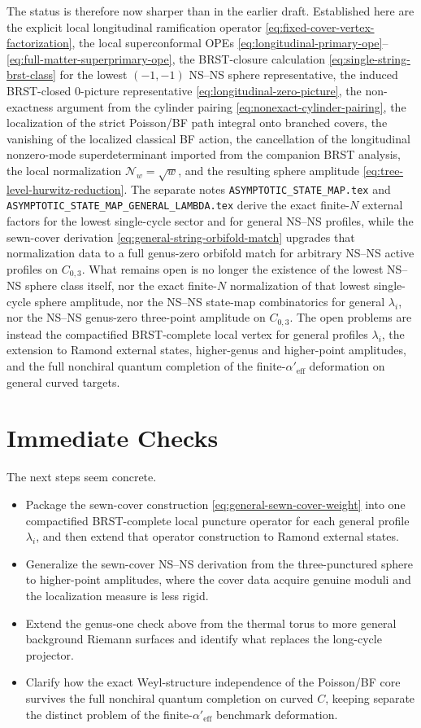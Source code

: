 \documentclass[11pt]{article}
\newcommand{\Aeff}{\alpha'_{\mathrm{eff}}}
\newcommand{\mc}[1]{\mathcal{#1}}
\begin{document}
The status is therefore now sharper than in the earlier draft. Established here are the explicit local longitudinal ramification operator \eqref{eq:fixed-cover-vertex-factorization}, the local superconformal OPEs \eqref{eq:longitudinal-primary-ope}--\eqref{eq:full-matter-superprimary-ope}, the BRST-closure calculation \eqref{eq:single-string-brst-class} for the lowest $(-1,-1)$ NS--NS sphere representative, the induced BRST-closed $0$-picture representative \eqref{eq:longitudinal-zero-picture}, the non-exactness argument from the cylinder pairing \eqref{eq:nonexact-cylinder-pairing}, the localization of the strict Poisson/BF path integral onto branched covers, the vanishing of the localized classical BF action, the cancellation of the longitudinal nonzero-mode superdeterminant imported from the companion BRST analysis, the local normalization $\mc N_w=\sqrt w$, and the resulting sphere amplitude \eqref{eq:tree-level-hurwitz-reduction}. The separate notes \texttt{ASYMPTOTIC\_STATE\_MAP.tex} and \texttt{ASYMPTOTIC\_STATE\_MAP\_GENERAL\_LAMBDA.tex} derive the exact finite-$N$ external factors for the lowest single-cycle sector and for general NS--NS profiles, while the sewn-cover derivation \eqref{eq:general-string-orbifold-match} upgrades that normalization data to a full genus-zero orbifold match for arbitrary NS--NS active profiles on $C_{0,3}$. What remains open is no longer the existence of the lowest NS--NS sphere class itself, nor the exact finite-$N$ normalization of that lowest single-cycle sphere amplitude, nor the NS--NS state-map combinatorics for general $\lambda_i$, nor the NS--NS genus-zero three-point amplitude on $C_{0,3}$. The open problems are instead the compactified BRST-complete local vertex for general profiles $\lambda_i$, the extension to Ramond external states, higher-genus and higher-point amplitudes, and the full nonchiral quantum completion of the finite-$\Aeff$ deformation on general curved targets.

\section{Immediate Checks}
The next steps seem concrete.
\begin{itemize}
\item Package the sewn-cover construction \eqref{eq:general-sewn-cover-weight} into one compactified BRST-complete local puncture operator for each general profile $\lambda_i$, and then extend that operator construction to Ramond external states.
\item Generalize the sewn-cover NS--NS derivation from the three-punctured sphere to higher-point amplitudes, where the cover data acquire genuine moduli and the localization measure is less rigid.
\item Extend the genus-one check above from the thermal torus to more general background Riemann surfaces and identify what replaces the long-cycle projector.
\item Clarify how the exact Weyl-structure independence of the Poisson/BF core survives the full nonchiral quantum completion on curved $C$, keeping separate the distinct problem of the finite-$\Aeff$ benchmark deformation.
\end{itemize}
\end{document}
